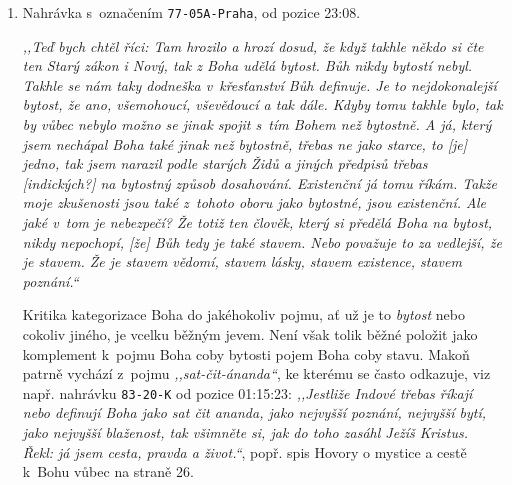 \begin{enumerate}

\item{%
Nahrávka s~označením \texttt{77-05A-Praha}, od pozice 23:08.

\textit{%
,,Teď bych chtěl říci: Tam hrozilo a hrozí dosud, že když takhle někdo si čte ten
Starý zákon i Nový, tak z Boha udělá bytost. Bůh nikdy bytostí nebyl. Takhle se
nám taky dodneška v~křesťanství Bůh definuje. Je to nejdokonalejší bytost, že
ano, všemohoucí, vševědoucí a tak dále. Kdyby tomu takhle bylo, tak by vůbec
nebylo možno se jinak spojit s~tím Bohem než bytostně. A já, který jsem nechápal
Boha také jinak než bytostně, třebas ne jako starce, to [je] jedno, tak jsem
narazil podle starých Židů a jiných předpisů třebas [indických?] na bytostný
způsob dosahování. Existenční já tomu říkám. Takže moje zkušenosti jsou také
z~tohoto oboru jako bytostné, jsou existenční. Ale jaké v~tom je nebezpečí? Že
totiž ten člověk, který si předělá Boha na bytost, nikdy nepochopí, [že] Bůh tedy je
také stavem. Nebo považuje to za vedlejší, že je stavem. Že je stavem vědomí,
stavem lásky, stavem existence, stavem poznání.``
}

Kritika kategorizace Boha do jakéhokoliv pojmu, ať už je to \textit{bytost} nebo
cokoliv jiného, je vcelku běžným jevem. Není však tolik běžné položit jako
komplement k~pojmu Boha coby bytosti pojem Boha coby stavu. Makoň patrně vychází
z~pojmu \textit{,,sat-čit-ánanda``}, ke kterému se často odkazuje, viz např.
nahrávku \texttt{83-20-K} od pozice 01:15:23: \textit{,,Jestliže Indové třebas
        říkají nebo definují Boha jako sat čit ananda, jako nejvyšší poznání,
        nejvyšší bytí, jako nejvyšší blaženost, tak všimněte si, jak do toho
        zasáhl Ježíš Kristus. Řekl: já jsem cesta, pravda a život.``}, popř.
        spis Hovory o mystice a cestě k~Bohu vůbec na straně
        26.\cite{KaMaHovory}

}
\end{enumerate}
